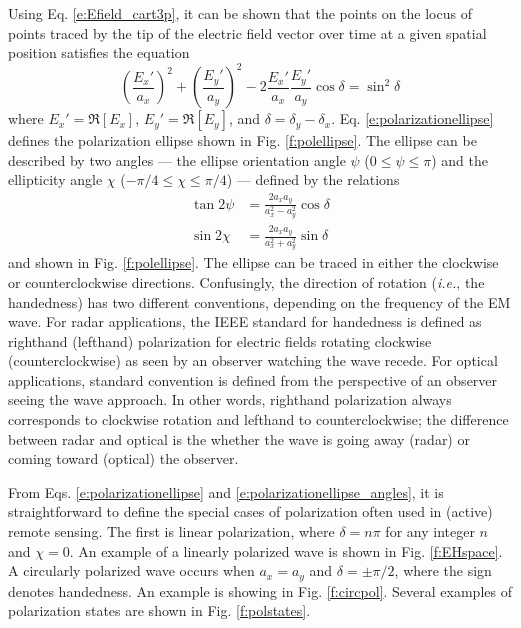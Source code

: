 \documentclass[11pt, oneside]{article}
\begin{document}
Using Eq. \ref{e:Efield_cart3p}, it can be shown that the points on the locus of points traced by the tip of the electric field vector over time at a given spatial position satisfies the equation
	\begin{equation}
	\label{e:polarizationellipse}
	\left(\frac{E_x'}{a_x}\right)^2 + \left(\frac{E_y'}{a_y}\right)^2 - 
			2\frac{E_x'}{a_x}\frac{E_y'}{a_y}\cos{\delta} = \sin^2{\delta}
	\end{equation}
where $E_x' = \Re{[E_x]}$, $E_y' = \Re{[E_y]}$, and $\delta = \delta_y - \delta_x$. Eq. \ref{e:polarizationellipse} defines the polarization ellipse shown in Fig. \ref{f:polellipse}. The ellipse can be described by two angles --- the ellipse orientation angle $\psi$ ($0\le\psi\le\pi$) and the ellipticity angle $\chi$ ($-\pi/4 \le\chi\le\pi/4$) --- defined by the relations
	\begin{subequations}
	\label{e:polarizationellipse_angles}
	\begin{align}
	\tan{2\psi} &= \frac{2a_xa_y}{a_x^2-a_y^2}\cos{\delta} \\
	\sin{2\chi} &= \frac{2a_xa_y}{a_x^2+a_y^2}\sin{\delta}
	\end{align}
	\end{subequations}
and shown in Fig. \ref{f:polellipse}. The ellipse can be traced in either the clockwise or counterclockwise directions. Confusingly, the direction of rotation (\emph{i.e.}, the handedness) has two different conventions, depending on the frequency of the EM wave. For radar applications, the IEEE standard for handedness is defined as righthand (lefthand) polarization for electric fields rotating clockwise (counterclockwise) as seen by an observer watching the wave recede. For optical applications, standard convention is defined from the perspective of an observer seeing the wave approach. In other words, righthand polarization always corresponds to clockwise rotation and lefthand to counterclockwise; the difference between radar and optical is the whether the wave is going away (radar) or coming toward (optical) the observer. 

From Eqs. \ref{e:polarizationellipse} and \ref{e:polarizationellipse_angles}, it is straightforward to define the special cases of polarization often used in (active) remote sensing. The first is linear polarization, where $\delta = n\pi$ for any integer $n$ and $\chi = 0$. An example of a linearly polarized wave is shown in Fig. \ref{f:EHspace}. A circularly polarized wave occurs when $a_x = a_y$ and $\delta = \pm \pi/2$, where the sign denotes handedness. An example is showing in Fig. \ref{f:circpol}. Several examples of polarization states are shown in Fig. \ref{f:polstates}.
\end{document}
